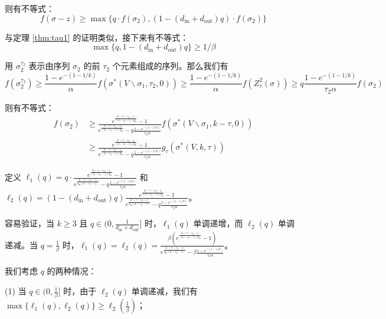 则有不等式：
\begin{equation}
f(\sigma-z)\ge \max\{ q \cdot f(\sigma_2),(1-(d_{\text{in}} + d_{\text{out}})q) \cdot f(\sigma_2)\} \label{equ:tau2_ine1}
\end{equation}

与定理 \ref{thm:tau1} 的证明类似，接下来有不等式：
\begin{equation}
    \max\{q,1-(d_{\text{in}} + d_{\text{out}})q\} \ge 1/\beta \label{equ:tau2_ine2}
\end{equation}

用 $\sigma_2^{\tau_2}$ 表示由序列 $\sigma_2$ 的前 $\tau_2$ 个元素组成的序列。那么我们有
\begin{equation}
f(\sigma_2^{\tau_2}) \ge \frac{1-e^{-(1-1/k)}}{\alpha} f(\sigma^*(V\backslash \sigma_1,\tau_2,0)) \ge  \frac{1-e^{-(1-1/k)}}{\alpha} f(Z_\tau^2(\sigma)) \ge q \frac{1-e^{-(1-1/k)}}{\tau_2 \alpha} f(\sigma_2)
\end{equation}

则有不等式：
\begin{align}
f(\sigma_2) &\ge \frac{e^{\frac{k-\tau-\tau_2-1}{(k-\tau_2-1)d_{\text{in}}}}-1}{e^{\frac{k-\tau-\tau_2-1}{(k-\tau_2-1)d_{\text{in}}}}- q \frac{1-e^{-(1-1/k)}}{\tau_2\alpha} } f(\sigma^*(V\backslash \sigma_1,k-\tau,0)) \\& \ge \frac{e^{\frac{k-\tau-\tau_2-1}{(k-\tau_2-1)d_{\text{in}}}}-1}{e^{\frac{k-\tau-\tau_2-1}{(k-\tau_2-1)d_{\text{in}}}}- q \frac{1-e^{-(1-1/k)}}{\tau_2\alpha} } g_\tau(\sigma^*(V,k,\tau)) \label{equ:tau2_ine3}
\end{align}

定义 $\ell_1(q) = q \cdot \frac{e^{\frac{k-\tau-\tau_2-1}{(k-\tau_2-1)d_{\text{in}}}}-1}{e^{\frac{k-\tau-\tau_2-1}
{d_{\text{in}}(k-\tau_2-1)}}-q \frac{1-e^{-(1-1/k)}}{\tau_2\alpha} }$ 和 $\ell_2(q) = (1-(d_{\text{in}} + d_{\text{out}})q) \frac{e^{\frac{k-\tau-\tau_2-1}{(k-\tau_2-1)d_{\text{in}}}}-1}{e^{\frac{k-\tau-\tau_2-1}
{d_{\text{in}}(k-\tau_2-1)}}-q \frac{1-e^{-(1-1/k)}}{\tau_2\alpha} }$。

容易验证，当 $k\ge 3$ 且 $q\in (0,\frac{1}{d_{\text{in}}+d_{\text{out}}}]$ 时，$\ell_1(q)$ 单调递增，而 $\ell_2(q)$ 单调递减。当 $q=\frac{1}{\beta}$ 时，$\ell_1(q)=\ell_2(q)=\frac{\beta(e^{\frac{k-\tau-\tau_2-1}{(k-\tau_2-1)d_{\text{in}}}}-1)}{e^{\frac{k-\tau-\tau_2-1}
{d_{\text{in}}(k-\tau_2-1)}}-\beta \frac{1-e^{-(1-1/k)}}{\tau_2\alpha} }$。

我们考虑 $q$ 的两种情况：

(1) 当 $q \in (0,\frac{1}{\beta}]$ 时，由于 $\ell_2(q)$ 单调递减，我们有 $\max\{\ell_1(q),\ell_2(q)\}\ge \ell_2(\frac{1}{\beta})$；

